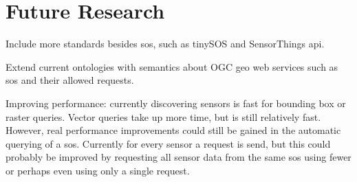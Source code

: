 
\chapter{Future Research}
\label{chap:futureResearch}

Include more standards besides \ac{sos}, such as tinySOS and SensorThings \ac{api}.

Extend current ontologies with semantics about OGC geo web services such as \ac{sos} and their allowed requests.

Improving performance: currently discovering sensors is fast for bounding box or raster queries. Vector queries take up more time, but is still relatively fast. However, real performance improvements could still be gained in the automatic querying of a \ac{sos}. Currently for every sensor a request is send, but this could probably be improved by requesting all sensor data from the same \ac{sos} using fewer or perhaps even using only a single request.  